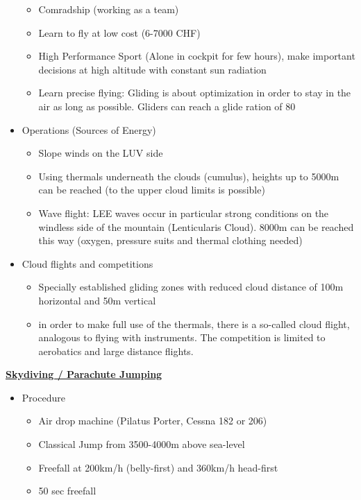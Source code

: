 \documentclass[9pt, landscape, fleqn]{scrartcl}
\begin{document}
\begin{multicols*}{3}
\begin{itemize}
\begin{itemize}
        \item Comradship (working as a team)
        \item Learn to fly at low cost (6-7000 CHF)
        \item High Performance Sport (Alone in cockpit for few hours), make important decisions at high altitude with constant sun radiation 
        \item Learn precise flying: Gliding is about optimization in order to stay in the air as long as possible. Gliders can reach a glide ration of 80
    \end{itemize}
    \item Operations (Sources of Energy)
    \begin{itemize}
        \item Slope winds on the LUV side 
        \item Using thermals underneath the clouds (cumulus), heights up to 5000m can be reached (to the upper cloud limits is possible)
        \item Wave flight: LEE waves occur in particular strong conditions on the windless side of the mountain (Lenticularis Cloud). 8000m can be reached this way (oxygen, pressure suits and thermal clothing needed) 
    \end{itemize}
    \item Cloud flights and competitions 
    \begin{itemize}
        \item Specially established gliding zones with reduced cloud distance of
        100m horizontal and 50m vertical
        \item in order to make full use of the thermals, there is a so-called cloud flight, analogous to flying with instruments.
        The competition is limited to aerobatics and large distance flights.
    \end{itemize}
\end{itemize}
\underline{\textbf{Skydiving / Parachute Jumping}}
\begin{itemize}
    \item Procedure 
    \begin{itemize}
        \item Air drop machine (Pilatus Porter, Cessna 182 or 206)
        \item Classical Jump from 3500-4000m above sea-level 
        \item Freefall at 200km/h (belly-first) and 360km/h head-first 
        \item 50 sec freefall 

\end{itemize}
\end{itemize}
\end{multicols*}
\end{document}
